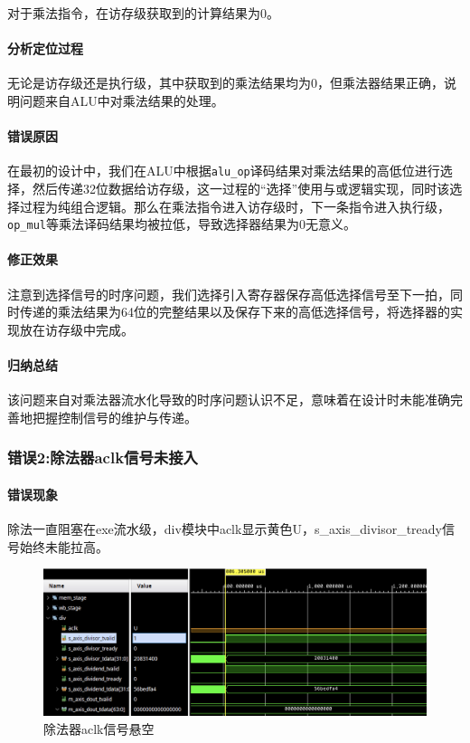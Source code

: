 \documentclass[UTF-8,twoside,c5size]{ctexart}
\begin{document}
	
	对于乘法指令，在访存级获取到的计算结果为0。
	
	\paragraph{分析定位过程}\hfill
	
	无论是访存级还是执行级，其中获取到的乘法结果均为0，但乘法器结果正确，说明问题来自ALU中对乘法结果的处理。
	
	\paragraph{错误原因}\hfill
	
	在最初的设计中，我们在ALU中根据\texttt{alu\_op}译码结果对乘法结果的高低位进行选择，然后传递32位数据给访存级，这一过程的“选择”使用与或逻辑实现，同时该选择过程为纯组合逻辑。那么在乘法指令进入访存级时，下一条指令进入执行级，\texttt{op\_mul}等乘法译码结果均被拉低，导致选择器结果为0无意义。
	
	\paragraph{修正效果}\hfill
	
	注意到选择信号的时序问题，我们选择引入寄存器保存高低选择信号至下一拍，同时传递的乘法结果为64位的完整结果以及保存下来的高低选择信号，将选择器的实现放在访存级中完成。
			
	\paragraph{归纳总结}\hfill
			
	该问题来自对乘法器流水化导致的时序问题认识不足，意味着在设计时未能准确完善地把握控制信号的维护与传递。
	
	\subsubsection{错误\textbf{2:}除法器aclk信号未接入}
	
	\paragraph{错误现象}\hfill
	
	除法一直阻塞在exe流水级，div模块中aclk显示黄色U，s\_axis\_divisor\_tready信号始终未能拉高。
	
	\begin{figure}[h]
		\centering
		\includegraphics[width=0.7\linewidth]{no_aclk.png}
		\caption[no\_aclk]{除法器aclk信号悬空}
		\label{fig:noaclk}
	\end{figure}
	
\end{document}
